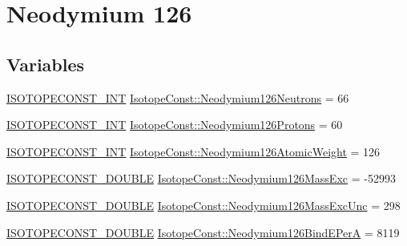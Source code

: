 \hypertarget{group___isotope_const-_neodymium-_nd126}{}\section{Neodymium 126}
\label{group___isotope_const-_neodymium-_nd126}
\subsection*{Variables}
\begin{DoxyCompactItemize}
\item 
\mbox{\hyperlink{group___isotope_const-_macros_ga5f18360b3e99483a35c32d789e62621c}{I\+S\+O\+T\+O\+P\+E\+C\+O\+N\+S\+T\+\_\+\+I\+NT}} \mbox{\hyperlink{group___isotope_const-_neodymium-_nd126_ga8db7836ed2ccc0049bd75f36758b4564}{Isotope\+Const\+::\+Neodymium126\+Neutrons}} = 66
\item 
\mbox{\hyperlink{group___isotope_const-_macros_ga5f18360b3e99483a35c32d789e62621c}{I\+S\+O\+T\+O\+P\+E\+C\+O\+N\+S\+T\+\_\+\+I\+NT}} \mbox{\hyperlink{group___isotope_const-_neodymium-_nd126_gabbf55f8af8dd307b5b1063076541dd6f}{Isotope\+Const\+::\+Neodymium126\+Protons}} = 60
\item 
\mbox{\hyperlink{group___isotope_const-_macros_ga5f18360b3e99483a35c32d789e62621c}{I\+S\+O\+T\+O\+P\+E\+C\+O\+N\+S\+T\+\_\+\+I\+NT}} \mbox{\hyperlink{group___isotope_const-_neodymium-_nd126_ga3fc3bfef8c245f539619e3af06483e75}{Isotope\+Const\+::\+Neodymium126\+Atomic\+Weight}} = 126
\item 
\mbox{\hyperlink{group___isotope_const-_macros_ga8f45a7272ce02c0b4c65c44636ed719a}{I\+S\+O\+T\+O\+P\+E\+C\+O\+N\+S\+T\+\_\+\+D\+O\+U\+B\+LE}} \mbox{\hyperlink{group___isotope_const-_neodymium-_nd126_gad9904220af0985237cf0c87e26e35e30}{Isotope\+Const\+::\+Neodymium126\+Mass\+Exc}} = -\/52993
\item 
\mbox{\hyperlink{group___isotope_const-_macros_ga8f45a7272ce02c0b4c65c44636ed719a}{I\+S\+O\+T\+O\+P\+E\+C\+O\+N\+S\+T\+\_\+\+D\+O\+U\+B\+LE}} \mbox{\hyperlink{group___isotope_const-_neodymium-_nd126_ga2728775aba01960e3624e4e19f54a7bd}{Isotope\+Const\+::\+Neodymium126\+Mass\+Exc\+Unc}} = 298
\item 
\mbox{\hyperlink{group___isotope_const-_macros_ga8f45a7272ce02c0b4c65c44636ed719a}{I\+S\+O\+T\+O\+P\+E\+C\+O\+N\+S\+T\+\_\+\+D\+O\+U\+B\+LE}} \mbox{\hyperlink{group___isotope_const-_neodymium-_nd126_ga40af2b5a4910b384486dec9e055e2328}{Isotope\+Const\+::\+Neodymium126\+Bind\+E\+PerA}} = 8119
\item 

\end{DoxyCompactItemize}
